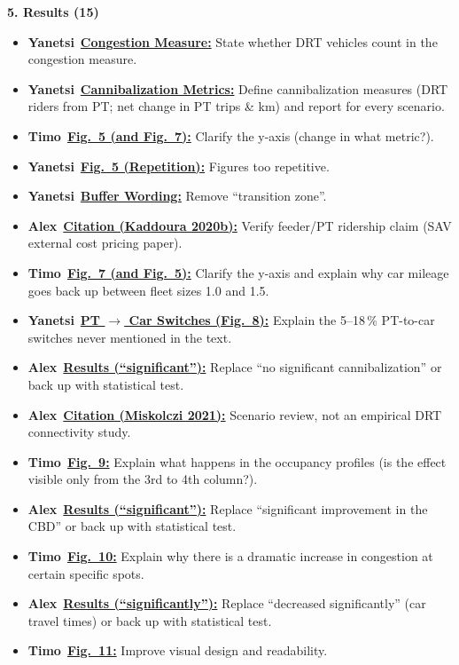 \documentclass[preprint,12pt,authoryear]{elsarticle}
\newcommand{\todobadge}[2]{\colorbox{#1}{\textbf{\scriptsize #2}}}
\newcommand{\badgeTimo}{\todobadge{orange!30}{Timo}}
\newcommand{\badgeAlex}{\todobadge{blue!25}{Alex}}
\newcommand{\badgeYanetsi}{\todobadge{purple!30}{Yanetsi}}
\begin{document}
\noindent\textbf{5. Results (15)}
\begin{itemize}\setlength{\itemsep}{1pt}\setlength{\parskip}{0pt}\setlength{\parsep}{0pt}
  \item[$\square$] \badgeYanetsi\ \hyperlink{todo:res-yanetsi-drt-cong}{\textbf{Congestion Measure:}} State whether DRT vehicles count in the congestion measure.
  \item[$\square$] \badgeYanetsi\ \hyperlink{todo:res-yanetsi-cannib-def}{\textbf{Cannibalization Metrics:}} Define cannibalization measures (DRT riders from PT; net change in PT trips \& km) and report for every scenario.
  \item[$\square$] \badgeTimo\ \hyperlink{todo:fig5-timo}{\textbf{Fig.~5 (and Fig.~7):}} Clarify the y-axis (change in what metric?).
  \item[$\square$] \badgeYanetsi\ \hyperlink{todo:res-yanetsi-figs-rep}{\textbf{Fig.~5 (Repetition):}} Figures too repetitive.
  \item[$\square$] \badgeYanetsi\ \hyperlink{todo:res-yanetsi-transition}{\textbf{Buffer Wording:}} Remove ``transition zone''.
  \item[$\square$] \badgeAlex\ \hyperlink{todo:res-cite-kaddoura2020b}{\textbf{Citation (Kaddoura 2020b):}} Verify feeder/PT ridership claim (SAV external cost pricing paper).
  \item[$\square$] \badgeTimo\ \hyperlink{todo:fig7-timo}{\textbf{Fig.~7 (and Fig.~5):}} Clarify the y-axis and explain why car mileage goes back up between fleet sizes 1.0 and 1.5.
  \item[$\square$] \badgeYanetsi\ \hyperlink{todo:res-yanetsi-pt-car}{\textbf{PT $\rightarrow$ Car Switches (Fig.~8):}} Explain the 5--18\,\% PT-to-car switches never mentioned in the text.
  \item[$\square$] \badgeAlex\ \hyperlink{todo:res-sig-cannib}{\textbf{Results (``significant''):}} Replace ``no significant cannibalization'' or back up with statistical test.
  \item[$\square$] \badgeAlex\ \hyperlink{todo:res-cite-miskolczi}{\textbf{Citation (Miskolczi 2021):}} Scenario review, not an empirical DRT connectivity study.
  \item[$\square$] \badgeTimo\ \hyperlink{todo:fig9-timo}{\textbf{Fig.~9:}} Explain what happens in the occupancy profiles (is the effect visible only from the 3rd to 4th column?).
  \item[$\square$] \badgeAlex\ \hyperlink{todo:res-sig-cbd}{\textbf{Results (``significant''):}} Replace ``significant improvement in the CBD'' or back up with statistical test.
  \item[$\square$] \badgeTimo\ \hyperlink{todo:fig10-timo}{\textbf{Fig.~10:}} Explain why there is a dramatic increase in congestion at certain specific spots.
  \item[$\square$] \badgeAlex\ \hyperlink{todo:res-sig-tt}{\textbf{Results (``significantly''):}} Replace ``decreased significantly'' (car travel times) or back up with statistical test.
  \item[$\square$] \badgeTimo\ \hyperlink{todo:fig11-timo}{\textbf{Fig.~11:}} Improve visual design and readability.
\end{itemize}
\end{document}
